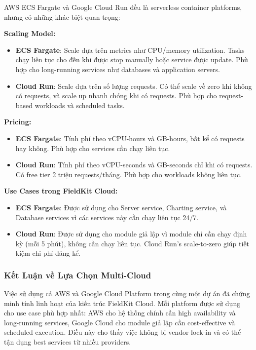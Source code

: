 AWS ECS Fargate và Google Cloud Run đều là serverless container platforms, nhưng có những khác biệt quan trọng:

\textbf{Scaling Model:}
\begin{itemize}
    \item \textbf{ECS Fargate}: Scale dựa trên metrics như CPU/memory utilization. Tasks chạy liên tục cho đến khi được stop manually hoặc service được update. Phù hợp cho long-running services như databases và application servers.
    \item \textbf{Cloud Run}: Scale dựa trên số lượng requests. Có thể scale về zero khi không có requests, và scale up nhanh chóng khi có requests. Phù hợp cho request-based workloads và scheduled tasks.
\end{itemize}

\textbf{Pricing:}
\begin{itemize}
    \item \textbf{ECS Fargate}: Tính phí theo vCPU-hours và GB-hours, bất kể có requests hay không. Phù hợp cho services cần chạy liên tục.
    \item \textbf{Cloud Run}: Tính phí theo vCPU-seconds và GB-seconds chỉ khi có requests. Có free tier 2 triệu requests/tháng. Phù hợp cho workloads không liên tục.
\end{itemize}

\textbf{Use Cases trong FieldKit Cloud:}
\begin{itemize}
    \item \textbf{ECS Fargate}: Được sử dụng cho Server service, Charting service, và Database services vì các services này cần chạy liên tục 24/7.
    \item \textbf{Cloud Run}: Được sử dụng cho module giả lập vì module chỉ cần chạy định kỳ (mỗi 5 phút), không cần chạy liên tục. Cloud Run's scale-to-zero giúp tiết kiệm chi phí đáng kể.
\end{itemize}

\subsubsection{Kết Luận về Lựa Chọn Multi-Cloud}

Việc sử dụng cả AWS và Google Cloud Platform trong cùng một dự án đã chứng minh tính linh hoạt của kiến trúc FieldKit Cloud. Mỗi platform được sử dụng cho use case phù hợp nhất: AWS cho hệ thống chính cần high availability và long-running services, Google Cloud cho module giả lập cần cost-effective và scheduled execution. Điều này cho thấy việc không bị vendor lock-in và có thể tận dụng best services từ nhiều providers.

